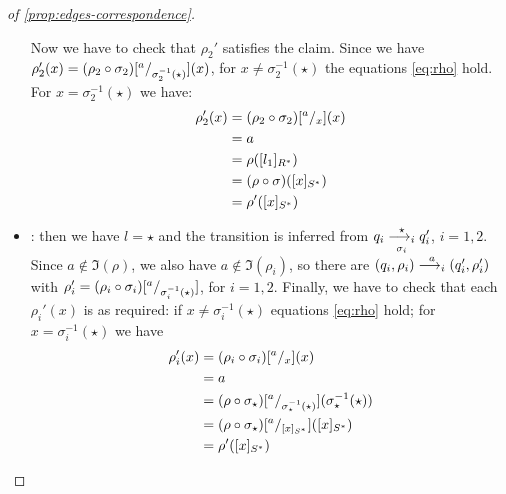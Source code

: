 \begin{proof}[of \cref{prop:edges-correspondence}]
\begin{itemize}
\begin{itemize}
	\end{itemize}
	Now we have to check that $\rho_2'$ satisfies the claim. Since we have $\rho'_2(x) = (\rho_2 \circ \sigma_2)[{}^{a}/_{\sigma_2^{-1}(\star)}](x)$, for $x \neq \sigma_2^{-1}(\star)$ the equations \eqref{eq:rho} hold. For $x =  \sigma_2^{-1}(\star)$ we have:
	\begin{align*}
		\rho'_2(x) &= (\rho_2 \circ \sigma_2)[{}^{a}/_{x}](x) \\
		&= a \\
		&= \rho([l_1]_{R^*}) \\
		&= (\rho \circ \sigma)([x]_{S^*}) \\
		& = \rho'([x]_{S^*})
	\end{align*}	


	\item \allrule: then we have $l=\star$ and the transition is inferred from $q_i \overset{\star}{\underset{\sigma_i}{\longrightarrow_{i}}} q_i'$, $i=1,2$. Since $a \notin \Im(\rho)$, we also have $a \notin \Im(\rho_i)$, so there are $(q_i,\rho_i) \overset{a}{\longrightarrow_{i}} (q_i',\rho_i')$ with $\rho_i' = (\rho_i \circ \sigma_i)[{}^{a}/_{\sigma^{-1}_i(\star)}]$, for $i=1,2$. Finally, we have to check that each $\rho_i'(x)$ is as required: if $x \neq\sigma_i^{-1}(\star)$ equations \eqref{eq:rho} hold; for $x=\sigma_i^{-1}(\star)$ we have
	\begin{align*}
		\rho'_i(x) &= (\rho_i \circ \sigma_i)[{}^{a}/_{x}](x) \\
		&= a \\
		&= (\rho \circ \sigma_\star) [{}^{a}/_{\sigma_\star^{-1}(\star)}](\sigma_\star^{-1}(\star)) \\
		&= (\rho \circ \sigma_\star) [{}^{a}/_{[x]_{S^*}}]([x]_{S^*}) \\
		&= \rho'([x]_{S^*})
	\end{align*}
	
\end{itemize} 



\end{proof}

